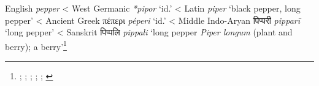 \begin{etymology}\label{ety:pepper}
English \textit{pepper}
< West Germanic \textit{*pipor} `id.'
< Latin \textit{piper} `black pepper, long pepper'
< Ancient Greek {πέπερι} \textit{péperi} `id.'
< Middle Indo-Aryan {पिप्परी } \textit{pipparī} `long pepper'
< Sanskrit {पिप्पलि } \textit{pippali} `long pepper \textit{Piper longum} (plant and berry); a berry'\footnote{\textcite{oed, med, bosworth_anglo-saxon_2014}; \textcite{oe}; \textcite{lewis_latin_1879}; \textcite{liddell_greek-english_1940}; \textcite[599]{sheth_paia-sadda-mahannavo_1923}; \textcite[626]{monier-williams_sanskrit-english_1899}}
\end{etymology}
